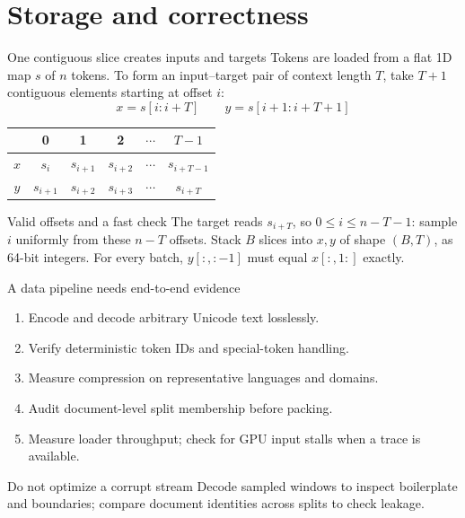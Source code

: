 \documentclass[handout]{beamer}
\begin{document}
\section{Storage and correctness}

\begin{frame}{One contiguous slice creates inputs and targets}
  \small
  Tokens are loaded from a flat 1D map $s$ of $n$ tokens.
  To form an input--target pair of context length $T$, take $T+1$ contiguous elements starting at offset $i$:
  \[
    x = s[i:i+T]
    \qquad
    y = s[i+1:i+T+1]
  \]
  \begin{center}
    \begin{tabular}{c|ccccc}
      & 0 & 1 & 2 & $\cdots$ & $T-1$ \\
      \hline
      $x$ & $s_i$ & $s_{i+1}$ & $s_{i+2}$ & $\cdots$ & $s_{i+T-1}$ \\
      $y$ & $s_{i+1}$ & $s_{i+2}$ & $s_{i+3}$ & $\cdots$ & $s_{i+T}$ \\
    \end{tabular}
  \end{center}
  \vfill
  \begin{block}{Valid offsets and a fast check}
    The target reads $s_{i+T}$, so $0\le i\le n-T-1$: sample $i$ uniformly from these $n-T$ offsets. Stack $B$ slices into $x,y$ of shape $(B,T)$, as 64-bit integers. For every batch, $y[:,:-1]$ must equal $x[:,1:]$ exactly.
  \end{block}
\end{frame}

\begin{frame}{A data pipeline needs end-to-end evidence}
  \begin{enumerate}
      \setlength{\itemsep}{7pt}
    \item Encode and decode arbitrary Unicode text losslessly.
    \item Verify deterministic token IDs and special-token handling.
    \item Measure compression on representative languages and domains.
    \item Audit document-level split membership before packing.
    \item Measure loader throughput; check for GPU input stalls when a trace is available.
  \end{enumerate}
  \begin{alertblock}{Do not optimize a corrupt stream}
    Decode sampled windows to inspect boilerplate and boundaries; compare document identities across splits to check leakage.
  \end{alertblock}
\end{frame}
\end{document}
